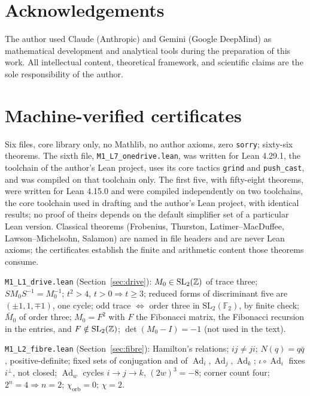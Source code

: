 \documentclass[11pt,a4paper]{article}
\theoremstyle{plain}
\theoremstyle{definition}
\theoremstyle{remark}
\newcommand{\Ad}{\operatorname{Ad}}
\begin{document}
\section*{Acknowledgements}
The author used Claude (Anthropic) and Gemini (Google DeepMind) as mathematical development and analytical tools during the preparation of this work. All intellectual content, theoretical framework, and scientific claims are the sole responsibility of the author.

\appendix

\section{Machine-verified certificates}\label{app:lean}

Six files, core library only, no Mathlib, no author axioms, zero \texttt{sorry}; sixty-six theorems. The sixth file, \texttt{M1\_L7\_onedrive.lean}, was written for Lean 4.29.1, the toolchain of the author's Lean project, uses its core tactics \texttt{grind} and \texttt{push\_cast}, and was compiled on that toolchain only. The first five, with fifty-eight theorems, were written for Lean 4.15.0 and were compiled independently on two toolchains, the core toolchain used in drafting and the author's Lean project, with identical results; no proof of theirs depends on the default simplifier set of a particular Lean version. Classical theorems (Frobenius, Thurston, Latimer--MacDuffee, Lawson--Michelsohn, Salamon) are named in file headers and are never Lean axioms; the certificates establish the finite and arithmetic content those theorems consume.

\texttt{M1\_L1\_drive.lean} (Section~\ref{sec:drive}): $M_{0}\in\mathrm{SL}_{2}(\mathbb{Z})$ of trace three; $SM_{0}S^{-1}=M_{0}^{-1}$; $t^{2}>4$, $t>0\Rightarrow t\geq3$; reduced forms of discriminant five are $(\pm1,1,\mp1)$, one cycle; odd trace $\Leftrightarrow$ order three in $\mathrm{SL}_{2}(\mathbb{F}_{2})$, by finite check; $\bar M_{0}$ of order three; $M_{0}=F^{2}$ with $F$ the Fibonacci matrix, the Fibonacci recursion in the entries, and $F\notin\mathrm{SL}_{2}(\mathbb{Z})$; $\det(M_{0}-I)=-1$ (not used in the text).

\texttt{M1\_L2\_fibre.lean} (Section~\ref{sec:fibre}): Hamilton's relations; $ij\neq ji$; $N(q)=q\bar q$, positive-definite; fixed sets of conjugation and of $\Ad_{i},\Ad_{j},\Ad_{k}$; $\iota\circ\Ad_{i}$ fixes $i^{\perp}$, not closed; $\Ad_{w}$ cycles $i\to j\to k$, $(2w)^{3}=-8$; corner count four; $2^{n}=4\Rightarrow n=2$; $\chi_{\mathrm{orb}}=0$; $\chi=2$.
\end{document}
